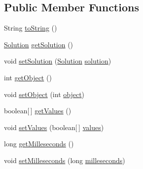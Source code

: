 \subsection*{Public Member Functions}
\begin{DoxyCompactItemize}
\item 
String \hyperlink{classedu_1_1pku_1_1id_1_1pbsolver_1_1_p_b_report_a7dd05b58115157dda3911a0e3ae15e0c}{toString} ()
\item 
\hyperlink{classedu_1_1pku_1_1id_1_1pbsolver_1_1_p_b_report_ac8d114f4470bac0e3d21bd99f818b477}{Solution} \hyperlink{classedu_1_1pku_1_1id_1_1pbsolver_1_1_p_b_report_af8a0708cc27670f2fffee873022ea750}{getSolution} ()
\item 
void \hyperlink{classedu_1_1pku_1_1id_1_1pbsolver_1_1_p_b_report_aa36ad56d43ca7bc3dfd24d5c2c066a55}{setSolution} (\hyperlink{classedu_1_1pku_1_1id_1_1pbsolver_1_1_p_b_report_ac8d114f4470bac0e3d21bd99f818b477}{Solution} \hyperlink{classedu_1_1pku_1_1id_1_1pbsolver_1_1_p_b_report_ab65beac0d1fd5ae85ac536441e3779a8}{solution})
\item 
int \hyperlink{classedu_1_1pku_1_1id_1_1pbsolver_1_1_p_b_report_aef48d68b512f8f0b73820ca48d1b27bb}{getObject} ()
\item 
void \hyperlink{classedu_1_1pku_1_1id_1_1pbsolver_1_1_p_b_report_af6e686dd46979b720f1d65e6085508c2}{setObject} (int \hyperlink{classedu_1_1pku_1_1id_1_1pbsolver_1_1_p_b_report_a8377cb6e4e24f0e618a0fa9a8072aef9}{object})
\item 
boolean\mbox{[}$\,$\mbox{]} \hyperlink{classedu_1_1pku_1_1id_1_1pbsolver_1_1_p_b_report_a26972d9e0b3f0efb69935c26326d2e75}{getValues} ()
\item 
void \hyperlink{classedu_1_1pku_1_1id_1_1pbsolver_1_1_p_b_report_a1456eea4bc73f9ba5068bf0705a11385}{setValues} (boolean\mbox{[}$\,$\mbox{]} \hyperlink{classedu_1_1pku_1_1id_1_1pbsolver_1_1_p_b_report_a537a45fd8738f95aea6e043fb58bacfe}{values})
\item 
long \hyperlink{classedu_1_1pku_1_1id_1_1pbsolver_1_1_p_b_report_a1a15f0a6ee5301cd4436253044b2fab6}{getMilleseconds} ()
\item 
void \hyperlink{classedu_1_1pku_1_1id_1_1pbsolver_1_1_p_b_report_a8f9bc8edfdc149e8fabbbb4022937e13}{setMilleseconds} (long \hyperlink{classedu_1_1pku_1_1id_1_1pbsolver_1_1_p_b_report_a0b23c36991f0012e4c3263a49c13dd53}{milleseconds})
\end{DoxyCompactItemize}
